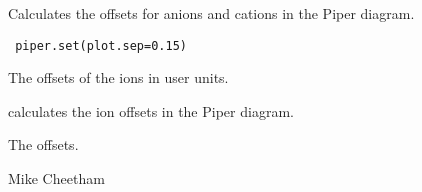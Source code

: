 \begin{Description}\relax
Calculates the offsets for anions and cations in the Piper
diagram.
\end{Description}
\begin{Usage}
\begin{verbatim}
 piper.set(plot.sep=0.15)
\end{verbatim}
\end{Usage}
\begin{Arguments}
\begin{ldescription}
\item[\code{plot.sep}] The offsets of the ions in user units.
\end{ldescription}
\end{Arguments}
\begin{Details}\relax
{} calculates the ion offsets in the Piper diagram.
\end{Details}
\begin{Value}
The offsets.
\end{Value}
\begin{Author}\relax
Mike Cheetham
\end{Author}
\begin{SeeAlso}\relax
{}
\end{SeeAlso}


